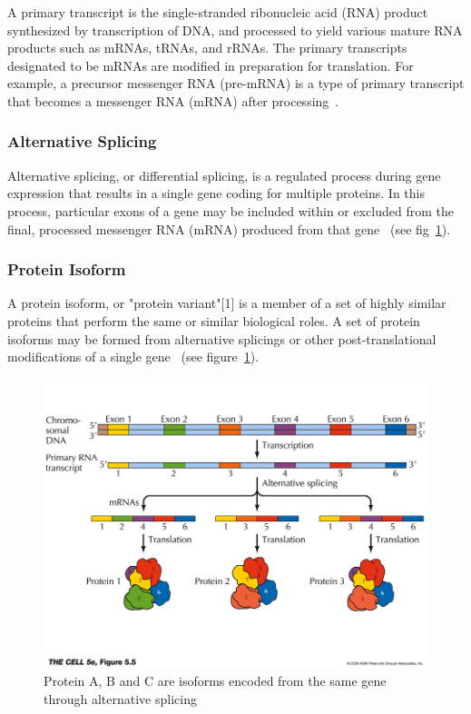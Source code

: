 A primary transcript is the single-stranded ribonucleic acid (RNA) product synthesized by transcription of DNA, and processed to yield various mature RNA products such as mRNAs, tRNAs, and rRNAs. The primary transcripts designated to be mRNAs are modified in preparation for translation. For example, a precursor messenger RNA (pre-mRNA) is a type of primary transcript that becomes a messenger RNA (mRNA) after processing~\cite{wiki:pritrans}.

\subsubsection{Alternative Splicing}
Alternative splicing, or differential splicing, is a regulated process during gene expression that results in a single gene coding for multiple proteins. In this process, particular exons of a gene may be included within or excluded from the final, processed messenger RNA (mRNA) produced from that gene~\cite{ wiki:altsp} (see fig~\ref{iso}).

\subsubsection{Protein Isoform}

A protein isoform, or "protein variant"[1] is a member of a set of highly similar proteins that perform the same or similar biological roles. A set of protein isoforms may be formed from alternative splicings or other post-translational modifications of a single gene~\cite{wiki:proiso} (see figure~\ref{iso}). \begin{figure}[htp]
\centering
\includegraphics[scale=0.50]{proiso.png}
\caption{Protein A, B and C are isoforms encoded from the same gene through alternative splicing~\cite{wiki:altsp}}
\label{iso}
\end{figure}
